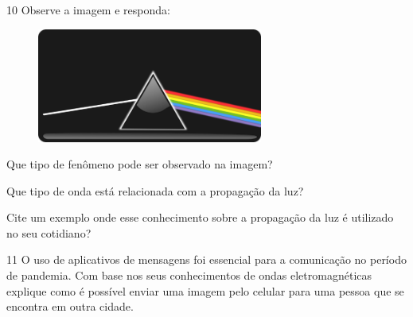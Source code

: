 \num{10} Observe a imagem e responda:

\begin{figure}[htpb!]
\includegraphics[width=2.91389in,height=1.47847in]{./imgs/img8.png}
\end{figure}

\begin{escolha}
\item  Que tipo de fenômeno pode ser observado na imagem?



\item Que tipo de onda está relacionada com a propagação da luz?



\item Cite um exemplo onde esse conhecimento sobre a propagação da luz é utilizado no seu cotidiano?


\end{escolha}


\num{11} O uso de aplicativos de mensagens foi essencial para a comunicação no período de pandemia. Com base nos seus conhecimentos de ondas eletromagnéticas explique como é possível enviar uma imagem pelo celular para uma pessoa que se encontra em outra cidade.




